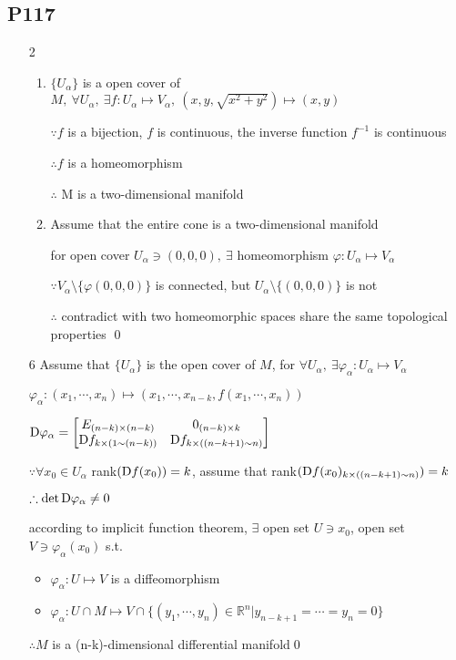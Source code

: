 \subsection{P117}
\begin{enumerate}[1]
    \item[2] 
    \begin{enumerate}[(1)]
        \item 
        $\{U_{\alpha}\}$ is a open cover of $M,\ \forall U_{\alpha},\ \exists f:U_{\alpha} \mapsto V_{\alpha},\ (x,y,\sqrt{x^2+y^2}) \mapsto (x,y) $
        \par $\because f$ is a bijection, $f$ is continuous, the inverse function $f^{-1}$ is continuous
        \par $ \therefore f $ is a homeomorphism
        \par $\therefore $ M is a  two-dimensional manifold

        \item 
        Assume that the entire cone is a two-dimensional manifold
        \par for open cover $U_{\alpha}\ni (0,0,0),\ \exists $ homeomorphism $ \varphi  : U_{\alpha} \mapsto V_{\alpha} $
        \par $ \because V_{\alpha} \setminus \{\varphi(0,0,0)\} $ is connected, but $U_{\alpha} \setminus \{(0,0,0)\}$ is not 
        \par $\therefore  $ contradict with two homeomorphic spaces share the same topological properties \qed
    \end{enumerate}

    \item[6]
    Assume that $\{U_{\alpha}\}$ is the open cover of $M$, for $\forall U_{\alpha},\ \exists \varphi_{\alpha}: U_{\alpha}\mapsto V_{\alpha}$
    \par $\varphi_{\alpha}:(x_1,\cdots,x_n) \mapsto (x_1,\cdots,x_{n-k},f(x_1,\cdots,x_n)) $
    \par $ \Dif \varphi_{\alpha} = \begin{bmatrix} E_{(n-k)\times (n-k)} & 0_{(n-k)\times k} \\\Dif f_{k\times (1\sim (n-k))} &\Dif f_{k\times ((n-k+1)\sim n )} \end{bmatrix}$
    \par $\because \forall x_0 \in U_{\alpha} $ rank$(\Dif f(x_0) )= k $, assume that rank$(\Dif f(x_0)_{k\times ((n-k+1)\sim n )} )= k $
    \par $\therefore \det \Dif \varphi_{\alpha} \not= 0 $
    \par according to implicit function theorem, $ \exists $ open set $ U \ni x_0 $, open set $ V \ni \varphi_{\alpha}(x_0)$ s.t. 
    \begin{itemize}
        \item 
        $ \varphi_{\alpha}: U \mapsto V$ is a diffeomorphism
        \item 
        $ \varphi_{\alpha}: U\cap M \mapsto V \cap \{(y_1,\cdots,y_n)\in \mathbb{R}^n | y_{n-k+1} = \cdots = y_n=0 \}$
    \end{itemize}  
    $ \therefore M$ is a (n-k)-dimensional differential manifold\qed
\end{enumerate}

